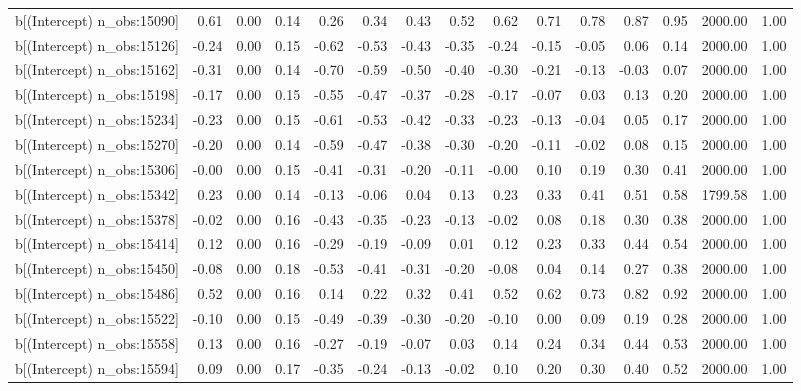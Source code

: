 \begin{table}[ht]
\begin{tabular}{rrrrrrrrrrrrrrr}
  b[(Intercept) n\_obs:15090] & 0.61 & 0.00 & 0.14 & 0.26 & 0.34 & 0.43 & 0.52 & 0.62 & 0.71 & 0.78 & 0.87 & 0.95 & 2000.00 & 1.00 \\ 
  b[(Intercept) n\_obs:15126] & -0.24 & 0.00 & 0.15 & -0.62 & -0.53 & -0.43 & -0.35 & -0.24 & -0.15 & -0.05 & 0.06 & 0.14 & 2000.00 & 1.00 \\ 
  b[(Intercept) n\_obs:15162] & -0.31 & 0.00 & 0.14 & -0.70 & -0.59 & -0.50 & -0.40 & -0.30 & -0.21 & -0.13 & -0.03 & 0.07 & 2000.00 & 1.00 \\ 
  b[(Intercept) n\_obs:15198] & -0.17 & 0.00 & 0.15 & -0.55 & -0.47 & -0.37 & -0.28 & -0.17 & -0.07 & 0.03 & 0.13 & 0.20 & 2000.00 & 1.00 \\ 
  b[(Intercept) n\_obs:15234] & -0.23 & 0.00 & 0.15 & -0.61 & -0.53 & -0.42 & -0.33 & -0.23 & -0.13 & -0.04 & 0.05 & 0.17 & 2000.00 & 1.00 \\ 
  b[(Intercept) n\_obs:15270] & -0.20 & 0.00 & 0.14 & -0.59 & -0.47 & -0.38 & -0.30 & -0.20 & -0.11 & -0.02 & 0.08 & 0.15 & 2000.00 & 1.00 \\ 
  b[(Intercept) n\_obs:15306] & -0.00 & 0.00 & 0.15 & -0.41 & -0.31 & -0.20 & -0.11 & -0.00 & 0.10 & 0.19 & 0.30 & 0.41 & 2000.00 & 1.00 \\ 
  b[(Intercept) n\_obs:15342] & 0.23 & 0.00 & 0.14 & -0.13 & -0.06 & 0.04 & 0.13 & 0.23 & 0.33 & 0.41 & 0.51 & 0.58 & 1799.58 & 1.00 \\ 
  b[(Intercept) n\_obs:15378] & -0.02 & 0.00 & 0.16 & -0.43 & -0.35 & -0.23 & -0.13 & -0.02 & 0.08 & 0.18 & 0.30 & 0.38 & 2000.00 & 1.00 \\ 
  b[(Intercept) n\_obs:15414] & 0.12 & 0.00 & 0.16 & -0.29 & -0.19 & -0.09 & 0.01 & 0.12 & 0.23 & 0.33 & 0.44 & 0.54 & 2000.00 & 1.00 \\ 
  b[(Intercept) n\_obs:15450] & -0.08 & 0.00 & 0.18 & -0.53 & -0.41 & -0.31 & -0.20 & -0.08 & 0.04 & 0.14 & 0.27 & 0.38 & 2000.00 & 1.00 \\ 
  b[(Intercept) n\_obs:15486] & 0.52 & 0.00 & 0.16 & 0.14 & 0.22 & 0.32 & 0.41 & 0.52 & 0.62 & 0.73 & 0.82 & 0.92 & 2000.00 & 1.00 \\ 
  b[(Intercept) n\_obs:15522] & -0.10 & 0.00 & 0.15 & -0.49 & -0.39 & -0.30 & -0.20 & -0.10 & 0.00 & 0.09 & 0.19 & 0.28 & 2000.00 & 1.00 \\ 
  b[(Intercept) n\_obs:15558] & 0.13 & 0.00 & 0.16 & -0.27 & -0.19 & -0.07 & 0.03 & 0.14 & 0.24 & 0.34 & 0.44 & 0.53 & 2000.00 & 1.00 \\ 
  b[(Intercept) n\_obs:15594] & 0.09 & 0.00 & 0.17 & -0.35 & -0.24 & -0.13 & -0.02 & 0.10 & 0.20 & 0.30 & 0.40 & 0.52 & 2000.00 & 1.00 \\ 

\end{tabular}
\end{table}
